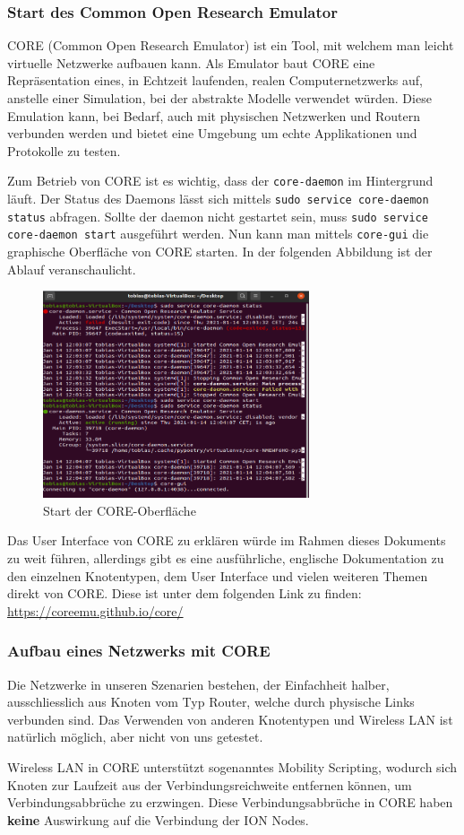 \documentclass{article}
\begin{document}
\subsubsection{Start des Common Open Research Emulator}
CORE (Common Open Research Emulator) ist ein Tool, mit welchem man leicht virtuelle Netzwerke aufbauen kann. Als Emulator baut CORE eine Repräsentation eines, in Echtzeit laufenden, realen Computernetzwerks auf, anstelle einer Simulation, bei der abstrakte Modelle verwendet würden. Diese Emulation kann, bei Bedarf, auch mit physischen Netzwerken und Routern verbunden werden und bietet eine Umgebung um echte Applikationen und Protokolle zu testen.\cite{core-docs} \par
Zum Betrieb von CORE ist es wichtig, dass der \texttt{core-daemon} im Hintergrund läuft. Der Status des Daemons lässt sich mittels \texttt{sudo service core-daemon status} abfragen. Sollte der daemon nicht gestartet sein, muss \texttt{sudo service core-daemon start} ausgeführt werden. Nun kann man mittels \texttt{core-gui} die graphische Oberfläche von CORE starten. In der folgenden Abbildung ist der Ablauf veranschaulicht.\par
\begin{figure}[ht]
\centering
\includegraphics[width=0.7\textwidth]{core-start}
\caption{Start der CORE-Oberfläche}
\end{figure}
Das User Interface von CORE zu erklären würde im Rahmen dieses Dokuments zu weit führen, allerdings gibt es eine ausführliche, englische Dokumentation zu den einzelnen Knotentypen, dem User Interface und vielen weiteren Themen direkt von CORE. Diese ist unter dem folgenden Link zu finden: \url{https://coreemu.github.io/core/}\par
\subsubsection{Aufbau eines Netzwerks mit CORE}
Die Netzwerke in unseren Szenarien bestehen, der Einfachheit halber, ausschliesslich aus Knoten vom Typ Router, welche durch physische Links verbunden sind. Das Verwenden von anderen Knotentypen und Wireless LAN ist natürlich möglich, aber nicht von uns getestet.\par
Wireless LAN in CORE unterstützt sogenanntes Mobility Scripting, wodurch sich Knoten zur Laufzeit aus der Verbindungsreichweite entfernen können, um Verbindungsabbrüche zu erzwingen. Diese Verbindungsabbrüche in CORE haben \textbf{keine} Auswirkung auf die Verbindung der ION Nodes.
\end{document}
